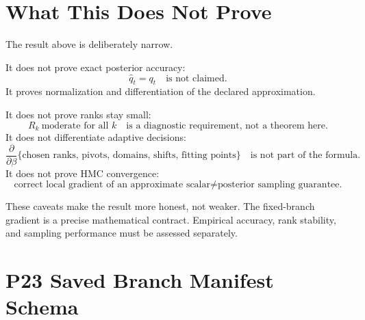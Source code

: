 \documentclass[11pt]{article}
\begin{document}
\section{What This Does Not Prove}

The result above is deliberately narrow.

It does not prove exact posterior accuracy:
\[
    \widehat q_t=q_t
    \quad\text{is not claimed.}
    \tag{P19-90}
\]
It proves normalization and differentiation of the declared approximation.

It does not prove ranks stay small:
\[
    R_k\ \text{moderate for all }k
    \quad\text{is a diagnostic requirement, not a theorem here.}
    \tag{P19-91}
\]
It does not differentiate adaptive decisions:
\[
    \frac{\partial}{\partial\beta}
    \{\text{chosen ranks, pivots, domains, shifts, fitting points}\}
    \quad\text{is not part of the formula.}
    \tag{P19-92}
\]
It does not prove HMC convergence:
\[
    \text{correct local gradient of an approximate scalar}
    \ne
    \text{posterior sampling guarantee.}
    \tag{P19-93}
\]

These caveats make the result more honest, not weaker.  The fixed-branch
gradient is a precise mathematical contract.  Empirical accuracy, rank
stability, and sampling performance must be assessed separately.

\section{P23 Saved Branch Manifest Schema}
\end{document}
